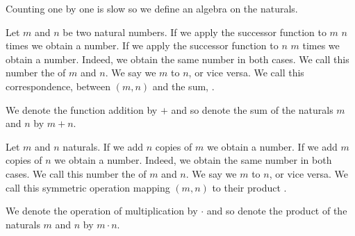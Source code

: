 \sbasic



\sstart
{}


Counting one by one is slow so we define
an algebra on the naturals.


Let $m$ and $n$ be two natural numbers.
If we apply the successor function to $m$ $n$
times we obtain a number.
If we apply the successor function to $n$ $m$
times we obtain a number.
Indeed, we obtain the same number in both cases.
We call this number the 
of $m$ and $n$.
We say we  $m$ to $n$,
or vice versa.
We call this correspondence, between
$(m, n)$ and the sum, .


We denote the function addition by $+$
and so denote the sum of the naturals
$m$ and $n$ by $m + n$.


Let $m$ and $n$ naturals.
If we add $n$ copies of $m$ we obtain a number.
If we add $m$ copies of $n$ we obtain a number.
Indeed, we obtain the same number in both cases.
We call this number the  of $m$ and $n$.
We say we  $m$ to $n$, or vice versa.
We call this symmetric operation mapping $(m, n)$ to their product
.


We denote the operation of multiplication by
$\cdot$ and so denote the product of the naturals
$m$ and $n$ by $m \cdot n$.

\strats
